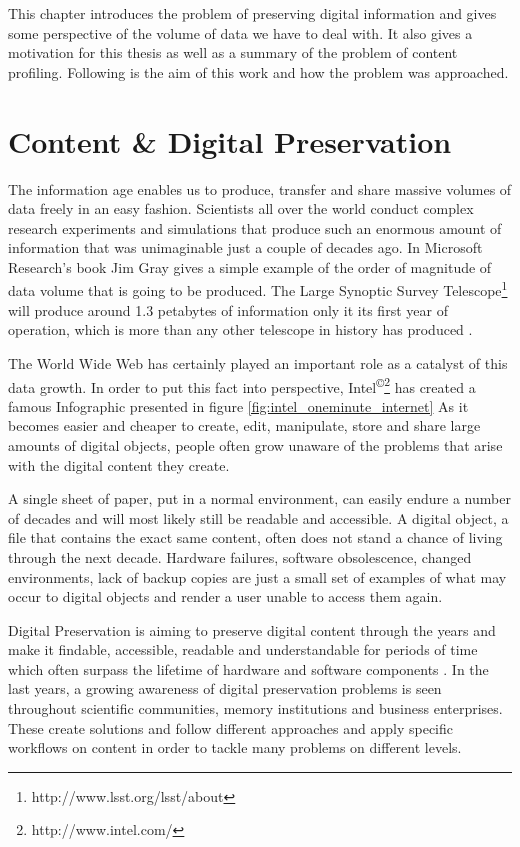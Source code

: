 This chapter introduces the problem of preserving digital information and gives some perspective of the volume of data we have to deal with. It also gives a motivation for this thesis as well as a summary of the problem of content profiling. Following is the aim of this work and how the problem was approached.

\section{Content \& Digital Preservation}
\label{ch:content_and_digital_preservation}
The information age enables us to produce, transfer and share massive volumes of data freely in an easy fashion. Scientists all over the world conduct complex research experiments and simulations that produce such an enormous amount of information that was unimaginable just a couple of decades ago. In Microsoft Research's book Jim Gray gives a simple example of the order of magnitude of data volume that is going to be produced. The Large Synoptic Survey Telescope\footnote{http://www.lsst.org/lsst/about} will produce around 1.3 petabytes of information only it its first year of operation, which is more than any other telescope in history has produced \cite{Gray:2009:fourthparadigm}.

The World Wide Web has certainly played an important role as a catalyst of this data growth. In order to put this fact into perspective, Intel\textsuperscript{\copyright}\footnote{http://www.intel.com/} has created a famous Infographic presented in figure \ref{fig:intel_oneminute_internet}
As it becomes easier and cheaper to create, edit, manipulate, store and share large amounts of digital objects, people often grow unaware of the problems that arise with the digital content they create.

A single sheet of paper, put in a normal environment, can easily endure a number of decades and will most likely still be readable and accessible. A digital object, a file that contains the exact same content, often does not stand a chance of living through the next decade. Hardware failures, software obsolescence, changed environments, lack of backup copies are just a small set of examples of what may occur to digital objects and render a user unable to access them again.

Digital Preservation is aiming to preserve digital content through the years and make it findable, accessible, readable and understandable for periods of time which often surpass the lifetime of hardware and software components \cite{DBLP:journals/dlib/RosenthalRLRM05}. In the last years, a growing awareness of digital preservation problems is seen throughout scientific communities, memory institutions and business enterprises. These create solutions and follow different approaches and apply specific workflows on content in order to tackle many problems on different levels.

